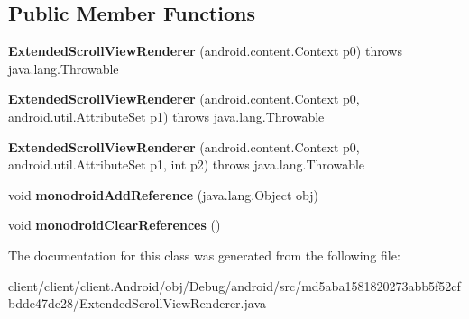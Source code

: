 \subsection*{Public Member Functions}
\begin{DoxyCompactItemize}
\item 
\hypertarget{classmd5aba1581820273abb5f52cfbdde47dc28_1_1ExtendedScrollViewRenderer_aa5a8cdfdcaa813587024311ec6d71845}{}{\bfseries Extended\+Scroll\+View\+Renderer} (android.\+content.\+Context p0)  throws java.\+lang.\+Throwable 	\label{classmd5aba1581820273abb5f52cfbdde47dc28_1_1ExtendedScrollViewRenderer_aa5a8cdfdcaa813587024311ec6d71845}

\item 
\hypertarget{classmd5aba1581820273abb5f52cfbdde47dc28_1_1ExtendedScrollViewRenderer_a01453fd061fd8ec36628ee1d3d7aed04}{}{\bfseries Extended\+Scroll\+View\+Renderer} (android.\+content.\+Context p0, android.\+util.\+Attribute\+Set p1)  throws java.\+lang.\+Throwable 	\label{classmd5aba1581820273abb5f52cfbdde47dc28_1_1ExtendedScrollViewRenderer_a01453fd061fd8ec36628ee1d3d7aed04}

\item 
\hypertarget{classmd5aba1581820273abb5f52cfbdde47dc28_1_1ExtendedScrollViewRenderer_a0f79a25dc80bed92b5c212fe3336d72c}{}{\bfseries Extended\+Scroll\+View\+Renderer} (android.\+content.\+Context p0, android.\+util.\+Attribute\+Set p1, int p2)  throws java.\+lang.\+Throwable 	\label{classmd5aba1581820273abb5f52cfbdde47dc28_1_1ExtendedScrollViewRenderer_a0f79a25dc80bed92b5c212fe3336d72c}

\item 
\hypertarget{classmd5aba1581820273abb5f52cfbdde47dc28_1_1ExtendedScrollViewRenderer_a1ee8844fa68c4041eb059227c68daf82}{}void {\bfseries monodroid\+Add\+Reference} (java.\+lang.\+Object obj)\label{classmd5aba1581820273abb5f52cfbdde47dc28_1_1ExtendedScrollViewRenderer_a1ee8844fa68c4041eb059227c68daf82}

\item 
\hypertarget{classmd5aba1581820273abb5f52cfbdde47dc28_1_1ExtendedScrollViewRenderer_a0371c0c92e92b9fefe20e38b2a68a3c6}{}void {\bfseries monodroid\+Clear\+References} ()\label{classmd5aba1581820273abb5f52cfbdde47dc28_1_1ExtendedScrollViewRenderer_a0371c0c92e92b9fefe20e38b2a68a3c6}

\end{DoxyCompactItemize}


The documentation for this class was generated from the following file\+:\begin{DoxyCompactItemize}
\item 
client/client/client.\+Android/obj/\+Debug/android/src/md5aba1581820273abb5f52cfbdde47dc28/Extended\+Scroll\+View\+Renderer.\+java\end{DoxyCompactItemize}
